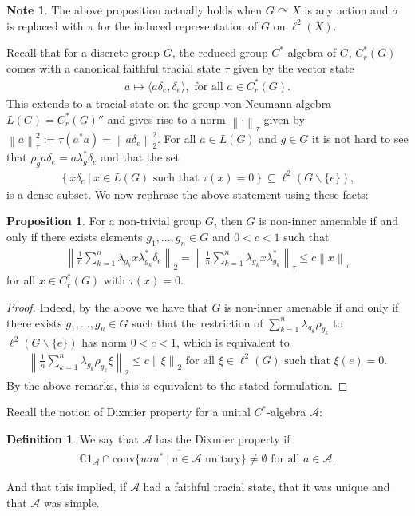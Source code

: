 \documentclass[10pt,oneside,openany,final]{memoir}
\theoremstyle{definition}
\newtheorem{proposition}[theorem]{Proposition}
\newtheorem{definition}[theorem]{Definition}
\theoremstyle{Break}
\newtheorem*{note}{Note}
\newcommand{\lv}{\left\lVert}
\newcommand{\rv}{\right\rVert}
\newcommand{\C}{\mathbb{C}}
\newcommand{\A}{\mathcal{A}}
\def\acts{\curvearrowright}
\begin{document}
\begin{note}
The above proposition actually holds when $G \acts X$ is any action and $\sigma$ is replaced with $\pi$ for the induced representation of $G$ on $\ell^2(X)$.
\end{note}
Recall that for a discrete group $G$, the reduced group $C^*$-algebra of $G$, $C_r^*(G)$ comes with a canonical faithful tracial state $\tau$ given by the vector state 
\begin{align*}
	a \mapsto \langle a \delta_e, \delta_e \rangle, \text{ for all } a \in C_r^*(G).
\end{align*}
This extends to a tracial state on the group von Neumann algebra $L(G)=C_r^*(G)''$ and gives rise to a norm $\lv  \cdot \rv_\tau$ given by $\lv a \rv_\tau^2 := \tau(a^*a)=\lv a \delta_e \rv_2^2$. For all $a \in L(G)$ and $g \in G$ it is not hard to see that $\rho_g a \delta_e = a \lambda_g^* \delta_e$ and that the set 
\begin{align*}
	\left\{ x \delta_e\ | \  x \in L(G) \text{ such that } \tau(x)=0 \right\} \subseteq \ell^2(G \backslash\{e\}),
\end{align*}
is a dense subset. We now rephrase the above statement using these facts:
\begin{proposition}
	For a non-trivial group $G$, then $G$ is non-inner amenable if and only if there exists elements $g_1,\dots,g_n \in G$ and $0 < c < 1$ such that 
	\begin{align*}
		\lv \frac{1}{n} \sum_{k=1}^n \lambda_{g_k}x \lambda_{g_k}^* \delta_e \rv_2 =\lv \frac{1}{n} \sum_{k=1}^n \lambda_{g_k} x \lambda_{g_k}^* \rv_\tau \leq c \lv x \rv_\tau
	\end{align*}
	for all $x \in C_r^*(G)$ with $\tau(x)=0$.
\end{proposition}
\begin{proof}
	Indeed, by the above we have that $G$ is non-inner amenable if and only if there exists $g_1,\dots,g_n \in G$ such that the restriction of $\sum_{k=1}^n \lambda_{g_k}\rho_{g_k}$ to $\ell^2(G \backslash\{e\})$ has norm $0 < c < 1$, which is equivalent to 
	\begin{align*}
		\lv \frac{1}{n} \sum_{k=1}^{n} \lambda_{g_k}\rho_{g_k}\xi \rv_2 \leq c \lv \xi \rv_2 \text{ for all } \xi \in \ell^2(G) \text{ such that } \xi(e)=0.
	\end{align*}
	By the above remarks, this is equivalent to the stated formulation.
\end{proof}

Recall the notion of Dixmier property for a unital $C^*$-algebra $\A$: 
\begin{definition}
We say that $\A$ has the Dixmier property if 
\begin{align*}
	\C 1_{\A} \cap \overline{\mathrm{conv}\{uau^* \ | \ u \in \A \text{ unitary} \}} \neq \emptyset \text{ for all } a \in \A.
\end{align*}
\end{definition}
And that this implied, if $\A$ had a faithful tracial state, that it was unique and that $\A$ was simple.
\end{document}
